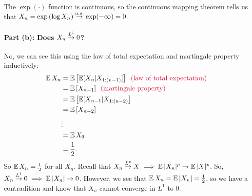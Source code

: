 {    The $\exp(\cdot)$ function is continuous, 
    so the continuous mapping theorem tells us that $X_n = \exp \left( \log X_n \right) \overset{a.s.}{\rightarrow} \exp(-\infty) = 0$.

    \paragraph{Part (b): Does $X_n \overset{L^{1}}{\rightarrow} 0$?}
    No, we can see this using the law of total expectation and martingale property inductively:
    \begin{align*}
        \E X_n
            &= \E \left[ \E[X_n | X_{1:(n-1)}] \right] \comm{law of total expectation} \\
            &= \E \left[ X_{n-1} \right] \comm{martingale property} \\
            &= \E \left[ \E[X_{n-1} | X_{1:(n-2)} \right] \\
            &= \E \left[ X_{n-2} \right] \\
            &\vdots \\
            &= \E X_0 \\
            &= \frac{1}{2}.
    \end{align*}
    So $\operatorname*{\mathbb{E}} X_n = \frac{1}{2}$ for all $X_n$. Recall that $X_n \overset{L^{p}}{\rightarrow} X \implies \operatorname*{\mathbb{E}} |X_n|^p \rightarrow \operatorname*{\mathbb{E}} |X|^p$.
    So, $X_n \overset{L^{1}}{\rightarrow} 0 \implies \operatorname*{\mathbb{E}} |X_n| \rightarrow 0$. However, we see that $\operatorname*{\mathbb{E}} X_n = \operatorname*{\mathbb{E}} |X_n| = \frac{1}{2}$,
    so we have a contradition and know that $X_n$ cannot converge in $L^1$ to 0.
}  
